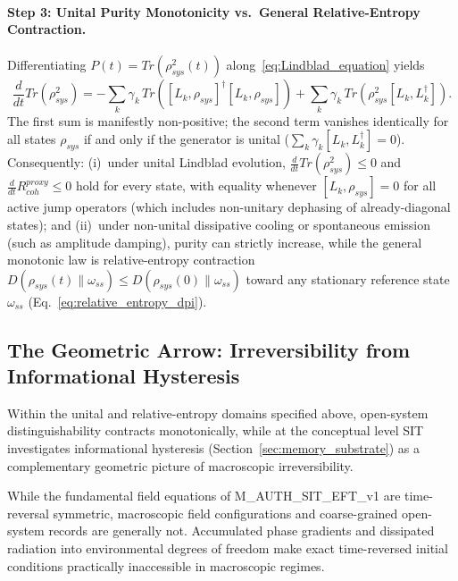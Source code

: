 \documentclass[american,11pt,letterpaper]{article}
\def\mathrm#1{#1}%
\def\texttt#1{#1}%
\def\emph#1{#1}%
\begin{document}
\paragraph{Step 3: Unital Purity Monotonicity vs.\ General Relative-Entropy Contraction.}
Differentiating $P(t) = \mathrm{Tr}(\rho_{\mathrm{sys}}^2(t))$ along~\eqref{eq:Lindblad_equation} yields
\begin{equation}
    \frac{d}{dt} \mathrm{Tr}(\rho_{\mathrm{sys}}^2)
    = -\sum_k \gamma_k\,\mathrm{Tr}\!\left([L_k, \rho_{\mathrm{sys}}]^\dagger [L_k, \rho_{\mathrm{sys}}]\right)
      + \sum_k \gamma_k\,\mathrm{Tr}\!\left(\rho_{\mathrm{sys}}^2 [L_k, L_k^\dagger]\right).
    \label{eq:purity_decay}
\end{equation}
The first sum is manifestly non-positive; the second term vanishes identically for all states $\rho_{\mathrm{sys}}$ if and only if the generator is unital ($\sum_k \gamma_k [L_k, L_k^\dagger] = 0$). Consequently: (i)~under \emph{unital} Lindblad evolution, $\frac{d}{dt}\mathrm{Tr}(\rho_{\mathrm{sys}}^2) \le 0$ and $\frac{d}{dt}R_{\mathrm{coh}}^{\mathrm{proxy}} \le 0$ hold for every state, with equality whenever $[L_k, \rho_{\mathrm{sys}}] = 0$ for all active jump operators (which includes non-unitary dephasing of already-diagonal states); and (ii)~under \emph{non-unital} dissipative cooling or spontaneous emission (such as amplitude damping), purity can strictly increase, while the general monotonic law is relative-entropy contraction $D(\rho_{\mathrm{sys}}(t)\|\omega_{\mathrm{ss}}) \le D(\rho_{\mathrm{sys}}(0)\|\omega_{\mathrm{ss}})$ toward any stationary reference state $\omega_{\mathrm{ss}}$ (Eq.~\eqref{eq:relative_entropy_dpi}).

\subsection{The Geometric Arrow: Irreversibility from Informational Hysteresis}

Within the unital and relative-entropy domains specified above, open-system distinguishability contracts monotonically, while at the conceptual level SIT investigates informational hysteresis (Section~\ref{sec:memory_substrate}) as a complementary geometric picture of macroscopic irreversibility.

While the fundamental field equations of \texttt{M\_AUTH\_SIT\_EFT\_v1} are time-reversal symmetric, macroscopic field configurations and coarse-grained open-system records are generally not. Accumulated phase gradients and dissipated radiation into environmental degrees of freedom make exact time-reversed initial conditions practically inaccessible in macroscopic regimes.
\end{document}
